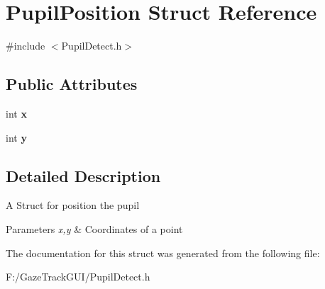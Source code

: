 \hypertarget{struct_pupil_position}{}\section{Pupil\+Position Struct Reference}
\label{struct_pupil_position}


{\ttfamily \#include $<$Pupil\+Detect.\+h$>$}

\subsection*{Public Attributes}
\begin{DoxyCompactItemize}
\item 
\mbox{\label{struct_pupil_position_a2e46ffc2d7349801767dc4ed827d9ab0}} 
int {\bfseries x}
\item 
\mbox{\label{struct_pupil_position_a9b676752799afa74e780f1beb206c97c}} 
int {\bfseries y}
\end{DoxyCompactItemize}


\subsection{Detailed Description}
A Struct for position the pupil 
\begin{DoxyParams}{Parameters}
{\em x,y} & Coordinates of a point \\
\hline
\end{DoxyParams}


The documentation for this struct was generated from the following file\+:\begin{DoxyCompactItemize}
\item 
F\+:/\+Gaze\+Track\+G\+U\+I/Pupil\+Detect.\+h\end{DoxyCompactItemize}
